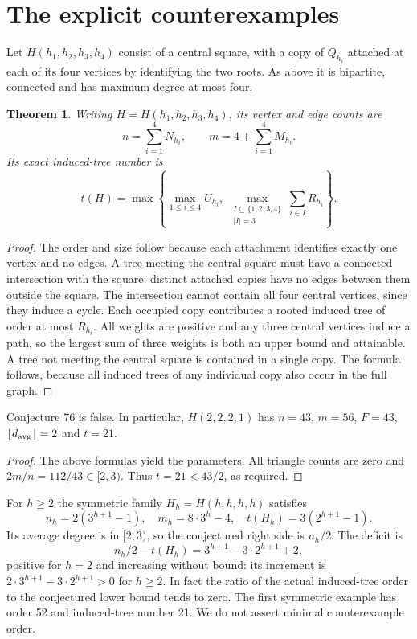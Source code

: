 \documentclass[11pt,a4paper]{article}
\newtheorem{theorem}{Theorem}
\begin{document}
\section{The explicit counterexamples}
Let $H(h_1,h_2,h_3,h_4)$ consist of a central square, with a copy of $Q_{h_i}$ attached at each of its four vertices by identifying the two roots. As above it is bipartite, connected and has maximum degree at most four.
\begin{theorem}
Writing $H=H(h_1,h_2,h_3,h_4)$, its vertex and edge counts are
\[
n=\sum_{i=1}^4N_{h_i},\qquad m=4+\sum_{i=1}^4M_{h_i}.
\]
Its exact induced-tree number is
\[
 t(H)=\max\left\{\max_{1\le i\le4}U_{h_i},
 \ \max_{\substack{I\subseteq\{1,2,3,4\}\\|I|=3}}\sum_{i\in I}R_{h_i}\right\}.
\]
\end{theorem}
\begin{proof}
The order and size follow because each attachment identifies exactly one vertex and no edges. A tree meeting the central square must have a connected intersection with the square: distinct attached copies have no edges between them outside the square. The intersection cannot contain all four central vertices, since they induce a cycle. Each occupied copy contributes a rooted induced tree of order at most $R_{h_i}$. All weights are positive and any three central vertices induce a path, so the largest sum of three weights is both an upper bound and attainable. A tree not meeting the central square is contained in a single copy. The formula follows, because all induced trees of any individual copy also occur in the full graph.
\end{proof}
\begin{corollary}
Conjecture 76 is false. In particular, $H(2,2,2,1)$ has $n=43$, $m=56$, $F=43$, $\lfloor d_{\rm avg}\rfloor=2$ and $t=21$.
\end{corollary}
\begin{proof}
The above formulas yield the parameters. All triangle counts are zero and $2m/n=112/43\in[2,3)$. Thus $t=21<43/2$, as required.
\end{proof}
For $h\ge2$ the symmetric family $H_h=H(h,h,h,h)$ satisfies
\[
 n_h=2(3^{h+1}-1),\quad m_h=8\cdot3^h-4,\quad
 t(H_h)=3(2^{h+1}-1).
\]
Its average degree is in $[2,3)$, so the conjectured right side is $n_h/2$. The deficit is
\[
 n_h/2-t(H_h)=3^{h+1}-3\cdot2^{h+1}+2,
\]
positive for $h=2$ and increasing without bound: its increment is $2\cdot3^{h+1}-3\cdot2^{h+1}>0$ for $h\ge2$. In fact the ratio of the actual induced-tree order to the conjectured lower bound tends to zero. The first symmetric example has order 52 and induced-tree number 21. We do not assert minimal counterexample order.
\end{document}
